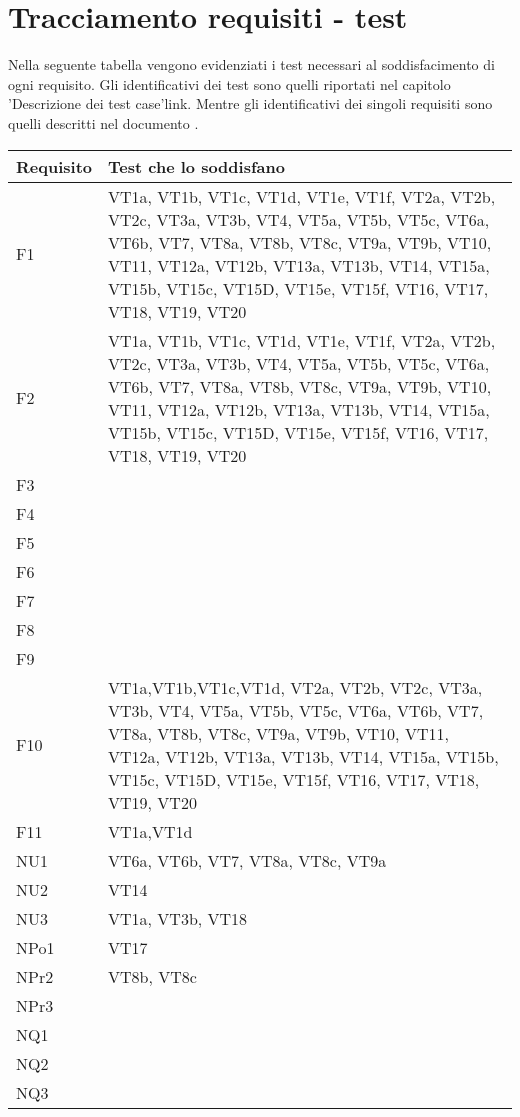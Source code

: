 \section{Tracciamento requisiti - test}
Nella seguente tabella vengono evidenziati i test necessari al soddisfacimento di ogni requisito. Gli identificativi dei test sono quelli riportati nel capitolo 'Descrizione dei test case'{link}. Mentre gli identificativi dei singoli requisiti sono quelli descritti nel documento \AR .
 \begin{center}
\begin{tabular}{|p{3cm}|p{8cm}|} \hline
\textbf{Requisito} & \textbf{Test che lo soddisfano}\\ \hline
F1  & VT1a, VT1b, VT1c, VT1d, VT1e, VT1f, VT2a, VT2b, VT2c, VT3a, VT3b, VT4, VT5a, VT5b, VT5c, VT6a, VT6b, VT7, VT8a, VT8b, VT8c, VT9a, VT9b, VT10, VT11, VT12a, VT12b, VT13a, VT13b, VT14, VT15a, VT15b, VT15c, VT15D, VT15e, VT15f, VT16, VT17, VT18, VT19, VT20\\ \hline
F2  &  VT1a, VT1b, VT1c, VT1d, VT1e, VT1f, VT2a, VT2b, VT2c, VT3a, VT3b, VT4, VT5a, VT5b, VT5c, VT6a, VT6b, VT7, VT8a, VT8b, VT8c, VT9a, VT9b, VT10, VT11, VT12a, VT12b, VT13a, VT13b, VT14, VT15a, VT15b, VT15c, VT15D, VT15e, VT15f, VT16, VT17, VT18, VT19, VT20\\ \hline
F3  &  \\ \hline
F4  &  \\ \hline
F5  &  \\ \hline
F6  &  \\ \hline
F7  &  \\ \hline
F8  &  \\ \hline
F9  &  \\ \hline
F10 & VT1a,VT1b,VT1c,VT1d, VT2a, VT2b, VT2c, VT3a, VT3b, VT4, VT5a, VT5b, VT5c, VT6a, VT6b, VT7, VT8a, VT8b, VT8c, VT9a, VT9b, VT10, VT11, VT12a, VT12b, VT13a, VT13b, VT14, VT15a, VT15b, VT15c, VT15D, VT15e, VT15f, VT16, VT17, VT18, VT19, VT20 \\ \hline
F11 & VT1a,VT1d \\ \hline
NU1 &  VT6a, VT6b, VT7, VT8a, VT8c, VT9a\\ \hline
NU2 &  VT14\\ \hline
NU3 &  VT1a, VT3b, VT18\\ \hline
NPo1 &  VT17\\ \hline
NPr2 &  VT8b, VT8c\\ \hline
NPr3 &  \\ \hline
NQ1 &  \\ \hline
NQ2 &  \\ \hline
NQ3 &  \\ \hline


\end{tabular} \\
\end{center}



